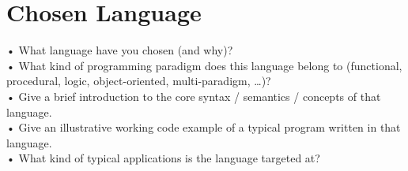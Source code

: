 \section{Chosen Language}
•	What language have you chosen (and why)?\\
•	What kind of programming paradigm does this language belong to (functional, procedural, logic, object-oriented, multi-paradigm, …)?\\
•	Give a brief introduction to the core syntax / semantics / concepts of that language.\\
•	Give an illustrative working code example of a typical program written in that language.\\
•	What kind of typical applications is the language targeted at?\\
